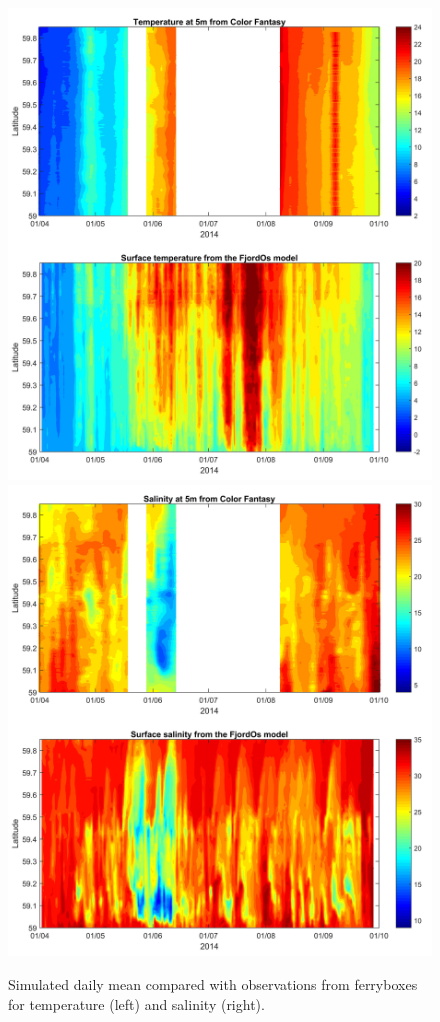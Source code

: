 \documentclass[12pt,a4paper,english]{article}
\begin{document}
\begin{figure}[t]
\centerline{
\includegraphics*[trim=1cm 0cm 1cm 0cm,clip=true,width=.5\textwidth]{Figurer/FjordOs_vs_Ferrybox_TEMP}
\includegraphics*[trim=1cm 0cm 1cm 0cm,clip=true,width=.5\textwidth]{Figurer/FjordOs_vs_Ferrybox_SALT}}
\caption{\small
Simulated daily mean compared with observations from ferryboxes for temperature (left) and salinity (right).}
\label{fig:Ferrybox_temp_salt}
\end{figure}

\clearpage 

%

\end{document}
